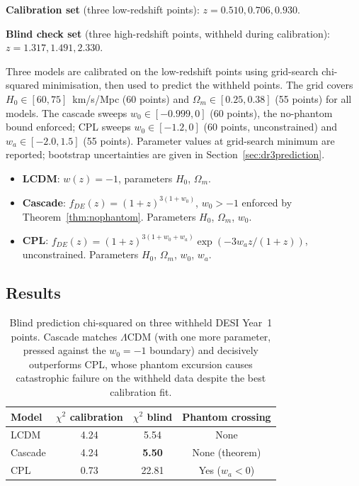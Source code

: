 \documentclass[12pt,a4paper]{article}
\theoremstyle{plain}
\theoremstyle{definition}
\begin{document}
\textbf{Calibration set} (three low-redshift points):
$z = 0.510, 0.706, 0.930$.

\textbf{Blind check set} (three high-redshift points, withheld during calibration):
$z = 1.317, 1.491, 2.330$.

Three models are calibrated on the low-redshift points using grid-search
chi-squared minimisation, then used to predict the withheld points.
The grid covers $H_0 \in [60, 75]$~km/s/Mpc (60 points) and
$\Omega_m \in [0.25, 0.38]$ (55 points) for all models.  The cascade
sweeps $w_0 \in [-0.999, 0]$ (60 points), the no-phantom bound enforced;
CPL sweeps $w_0 \in [-1.2, 0]$ (60 points, unconstrained) and
$w_a \in [-2.0, 1.5]$ (55 points).
Parameter values at grid-search minimum are reported; bootstrap uncertainties
are given in Section~\ref{sec:dr3prediction}.

\begin{itemize}
\item \textbf{LCDM}: $w(z) = -1$, parameters $H_0$, $\Omega_m$.
\item \textbf{Cascade}: $f_{DE}(z) = (1+z)^{3(1+w_0)}$, $w_0 > -1$ enforced by
  Theorem~\ref{thm:nophantom}. Parameters $H_0$, $\Omega_m$, $w_0$.
\item \textbf{CPL}: $f_{DE}(z) = (1+z)^{3(1+w_0+w_a)}\exp(-3w_a z/(1+z))$,
  unconstrained. Parameters $H_0$, $\Omega_m$, $w_0$, $w_a$.
\end{itemize}

\subsection{Results}

\begin{table}[h]
\centering
\begin{tabular}{lccc}
\toprule
Model & $\chi^2$ calibration & $\chi^2$ blind & Phantom crossing \\
\midrule
LCDM    & 4.24  & 5.54  & None \\
Cascade & 4.24  & \textbf{5.50}  & None (theorem) \\
CPL     & 0.73  & 22.81 & Yes ($w_a < 0$) \\
\bottomrule
\end{tabular}
\caption{Blind prediction chi-squared on three withheld DESI Year~1 points.
Cascade matches $\Lambda$CDM (with one more parameter, pressed against the
$w_0 = -1$ boundary) and decisively outperforms CPL, whose phantom excursion
causes catastrophic failure on the withheld data despite the best calibration
fit.}
\end{table}
\end{document}
